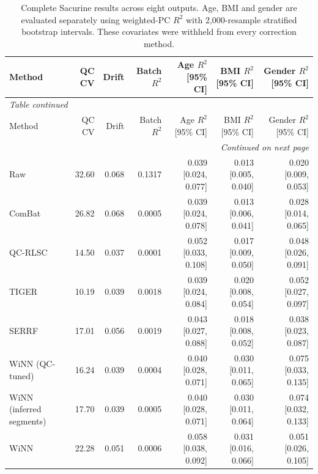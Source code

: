 \begin{landscape}
\scriptsize
\begin{longtable}{lrrrrrr}
\caption{Complete Sacurine results across eight outputs. Age, BMI and gender are evaluated separately using weighted-PC $R^2$ with 2,000-resample stratified bootstrap intervals. These covariates were withheld from every correction method.}\label{tab:supp_sacurine_all}\\
\toprule
Method & QC CV & Drift & Batch $R^2$ & Age $R^2$ [95\% CI] & BMI $R^2$ [95\% CI] & Gender $R^2$ [95\% CI] \\
\midrule
\endfirsthead
\multicolumn{7}{l}{\textit{Table \thetable{} continued}}\\
\toprule
Method & QC CV & Drift & Batch $R^2$ & Age $R^2$ [95\% CI] & BMI $R^2$ [95\% CI] & Gender $R^2$ [95\% CI] \\
\midrule
\endhead
\midrule
\multicolumn{7}{r}{\textit{Continued on next page}}\\
\endfoot
\bottomrule
\endlastfoot
Raw & 32.60 & 0.068 & 0.1317 & 0.039 [0.024, 0.077] & 0.013 [0.005, 0.040] & 0.020 [0.009, 0.053] \\
ComBat & 26.82 & 0.068 & 0.0005 & 0.039 [0.024, 0.078] & 0.013 [0.006, 0.041] & 0.028 [0.014, 0.065] \\
QC-RLSC & 14.50 & 0.037 & 0.0001 & 0.052 [0.033, 0.108] & 0.017 [0.009, 0.050] & 0.048 [0.026, 0.091] \\
TIGER & 10.19 & 0.039 & 0.0018 & 0.039 [0.024, 0.084] & 0.020 [0.008, 0.054] & 0.052 [0.027, 0.097] \\
SERRF & 17.01 & 0.056 & 0.0019 & 0.043 [0.027, 0.088] & 0.018 [0.008, 0.052] & 0.038 [0.023, 0.087] \\
WiNN (QC-tuned) & 16.24 & 0.039 & 0.0004 & 0.040 [0.028, 0.071] & 0.030 [0.011, 0.065] & 0.075 [0.033, 0.135] \\
WiNN (inferred segments) & 17.70 & 0.039 & 0.0005 & 0.040 [0.028, 0.071] & 0.030 [0.011, 0.064] & 0.074 [0.032, 0.133] \\
WiNN & 22.28 & 0.051 & 0.0006 & 0.058 [0.038, 0.092] & 0.031 [0.016, 0.066] & 0.051 [0.026, 0.105] \\
\end{longtable}
\end{landscape}

